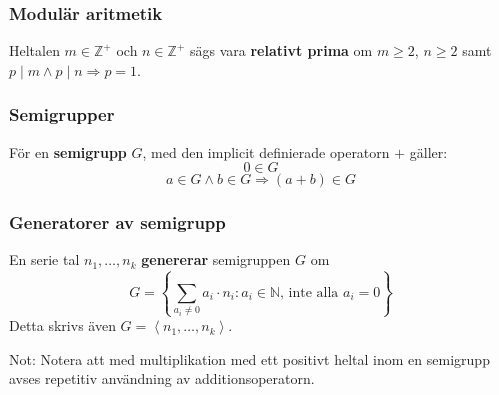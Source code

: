 \documentclass{beamer}
\begin{document}
\begin{frame}
	\frametitle{Modulär aritmetik}
\begin{Definition}
	Heltalen $m \in \mathbb{Z}^+$ och $n \in \mathbb{Z}^+$ sägs vara \textbf{relativt prima} om $m \geq 2$, $n \geq 2$ samt $p \mid m \wedge p \mid n \Longrightarrow p = 1$.
\end{Definition}
\end{frame}

\begin{frame}
	\frametitle{Semigrupper}
\begin{Definition}
	För en \textbf{semigrupp} $G$, med den implicit definierade operatorn $+$ gäller:
	\[0 \in G\]
	\[a \in G \wedge b \in G \Longrightarrow (a + b) \in G\]
\end{Definition}
\end{frame}

\begin{frame}
	\frametitle{Generatorer av semigrupp}
\begin{Definition}
	En serie tal $n_1, \ldots, n_k$ \textbf{genererar} semigruppen $G$ om
	\[G = \left\{\sum_{a_i\neq 0} a_i \cdot n_i : a_i \in \mathbb{N}\text{, inte alla $a_i=0$}\right\}\]
	Detta skrivs även $G = \left<n_1, \ldots, n_k \right>$.
\end{Definition}

\vspace{20pt}
\scriptsize Not: Notera att med multiplikation med ett positivt heltal inom en semigrupp avses repetitiv användning av additionsoperatorn.
\end{frame}
\end{document}
